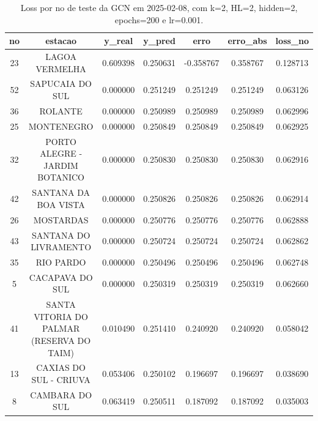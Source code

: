 \begin{table}[h]
\centering
\caption{Loss por no de teste da GCN em 2025-02-08, com k=2, HL=2, hidden=2, epochs=200 e lr=0.001.}
\label{tab:gcn_loss_k2_hl2_h2_e200_d20250208}
\begin{tabular}{ccccccc}
\toprule
no & estacao & y\_real & y\_pred & erro & erro\_abs & loss\_no \\
\midrule
23 & LAGOA VERMELHA & 0.609398 & 0.250631 & -0.358767 & 0.358767 & 0.128713 \\
52 & SAPUCAIA DO SUL & 0.000000 & 0.251249 & 0.251249 & 0.251249 & 0.063126 \\
36 & ROLANTE & 0.000000 & 0.250989 & 0.250989 & 0.250989 & 0.062996 \\
25 & MONTENEGRO & 0.000000 & 0.250849 & 0.250849 & 0.250849 & 0.062925 \\
32 & PORTO ALEGRE - JARDIM BOTANICO & 0.000000 & 0.250830 & 0.250830 & 0.250830 & 0.062916 \\
42 & SANTANA DA BOA VISTA & 0.000000 & 0.250826 & 0.250826 & 0.250826 & 0.062914 \\
26 & MOSTARDAS & 0.000000 & 0.250776 & 0.250776 & 0.250776 & 0.062888 \\
43 & SANTANA DO LIVRAMENTO & 0.000000 & 0.250724 & 0.250724 & 0.250724 & 0.062862 \\
35 & RIO PARDO & 0.000000 & 0.250496 & 0.250496 & 0.250496 & 0.062748 \\
5 & CACAPAVA DO SUL & 0.000000 & 0.250319 & 0.250319 & 0.250319 & 0.062660 \\
41 & SANTA VITORIA DO PALMAR (RESERVA DO TAIM) & 0.010490 & 0.251410 & 0.240920 & 0.240920 & 0.058042 \\
13 & CAXIAS DO SUL - CRIUVA & 0.053406 & 0.250102 & 0.196697 & 0.196697 & 0.038690 \\
8 & CAMBARA DO SUL & 0.063419 & 0.250511 & 0.187092 & 0.187092 & 0.035003 \\
\bottomrule
\end{tabular}
\end{table}
